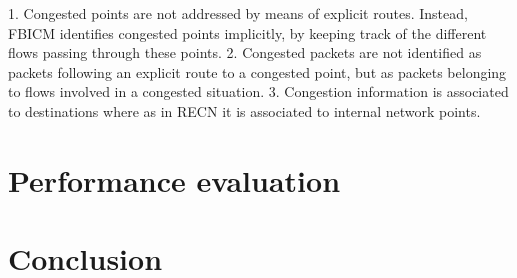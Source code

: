 \documentclass[12pt]{article}
\begin{document}
1. Congested points are not addressed by means of explicit routes. Instead, FBICM identifies congested points implicitly, by keeping track of the different flows passing through these points.
2. Congested packets are not identified as packets following an explicit route to a congested point, but as packets belonging to flows involved in a congested situation. 
3. Congestion information is associated to destinations where as in RECN it is associated
to internal network points.

\section{Performance evaluation}\label{S:performance}


\section{Conclusion}\label{S:conclusion}


\newpage
\end{document}
